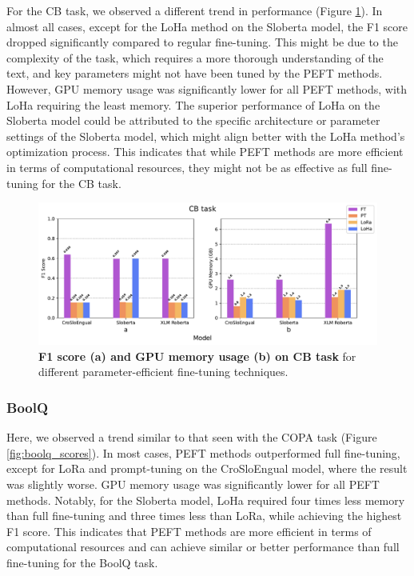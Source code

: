 \documentclass[fleqn,moreauthors,10pt]{ds_report}
\begin{document}
For the CB task, we observed a different trend in performance (Figure \ref{fig:cb_scores}). In almost all cases, except for the LoHa method on the Sloberta model, the F1 score dropped significantly compared to regular fine-tuning. This might be due to the complexity of the task, which requires a more thorough understanding of the text, and key parameters might not have been tuned by the PEFT methods. However, GPU memory usage was significantly lower for all PEFT methods, with LoHa requiring the least memory. The superior performance of LoHa on the Sloberta model could be attributed to the specific architecture or parameter settings of the Sloberta model, which might align better with the LoHa method's optimization process. This indicates that while PEFT methods are more efficient in terms of computational resources, they might not be as effective as full fine-tuning for the CB task.

\begin{figure}[ht]\centering
	\includegraphics[width=\linewidth]{results/superglue/CB.pdf}
	\caption{\textbf{F1 score (a) and GPU memory usage (b) on CB task} for different parameter-efficient fine-tuning techniques.}
	\label{fig:cb_scores}
\end{figure}

\subsubsection*{BoolQ}

Here, we observed a trend similar to that seen with the COPA task (Figure \ref{fig:boolq_scores}). In most cases, PEFT methods outperformed full fine-tuning, except for LoRa and prompt-tuning on the CroSloEngual model, where the result was slightly worse. GPU memory usage was significantly lower for all PEFT methods. Notably, for the Sloberta model, LoHa required four times less memory than full fine-tuning and three times less than LoRa, while achieving the highest F1 score. This indicates that PEFT methods are more efficient in terms of computational resources and can achieve similar or better performance than full fine-tuning for the BoolQ task.
\end{document}

